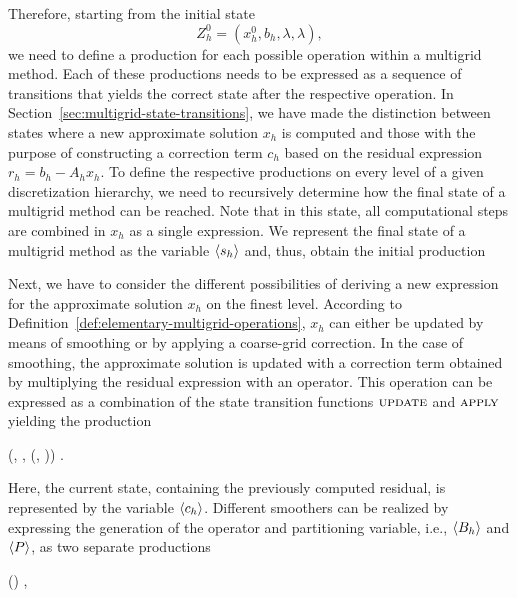 Therefore, starting from the initial state 
\begin{equation}
	Z^0_h = (x_h^0, b_h, \lambda, \lambda),
 \label{eq:initial-mg-state}
\end{equation}
we need to define a production for each possible operation within a multigrid method.
Each of these productions needs to be expressed as a sequence of transitions that yields the correct state after the respective operation.
In Section~\ref{sec:multigrid-state-transitions}, we have made the distinction between states where a new approximate solution $x_h$ is computed and those with the purpose of constructing a correction term $c_h$ based on the residual expression $r_h = b_h - A_h x_h$.
To define the respective productions on every level of a given discretization hierarchy, we need to recursively determine how the final state of a multigrid method can be reached.
Note that in this state, all computational steps are combined in $x_h$ as a single expression.
We represent the final state of a multigrid method as the variable $\langle s_h \rangle$ and, thus, obtain the initial production
\begin{production}
	 {
	}
\end{production}
Next, we have to consider the different possibilities of deriving a new expression for the approximate solution $x_{h}$ on the finest level.
According to Definition~\ref{def:elementary-multigrid-operations}, $x_{h}$ can either be updated by means of smoothing or by applying a coarse-grid correction.
In the case of smoothing, the approximate solution is updated with a correction term obtained by multiplying the residual expression with an operator.
This operation can be expressed as a combination of the state transition functions $\textsc{update}$ and $\textsc{apply}$ yielding the production
\begin{production}
	 {
		(\bnfts{$\omega$}, \bnfsp {}, \bnfsp {}(, \bnfsp {}))
	}.
\label{prod:smoothing}
\end{production}
Here, the current state, containing the previously computed residual, is represented by the variable $\langle c_h \rangle$.
Different smoothers can be realized by expressing the generation of the operator and partitioning variable, i.e., $\langle B_h \rangle$ and $\langle P \rangle$, as two separate productions
\begin{production}
	 {
		() \bnfsp {} \bnfsp {}
	},
\label{prod:smoothing-operator}
\end{production}
